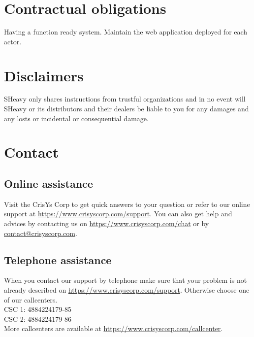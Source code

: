 \section{Contractual obligations}
Having a function ready system. Maintain the web application deployed for each
actor.

\section{Disclaimers}
SHeavy only shares instructions from trustful organizations and in no event
will SHeavy or its distributors and their dealers be liable to you for any
damages and any losts or incidental or consequential damage.

\section{Contact}

\subsection{Online assistance}
Visit the CrisYs Corp to get quick answers to your question or refer to our
online support at \url{https://www.crisyscorp.com/support}. You can also get
help and advices by contacting us on \url{https://www.crisyscorp.com/chat} or by
\href{mailto:contact@crisyscorp.com}{contact@crisyscorp.com}.

\subsection{Telephone assistance}
When you contact our support by telephone make sure that your problem is not already
described on \url{https://www.crisyscorp.com/support}. Otherwise choose one of
our callcenters.\\
CSC 1:  4884224179-85 \\
CSC 2:  4884224179-86 \\ 
More callcenters are available at \url{https://www.crisyscorp.com/callcenter}.\\


